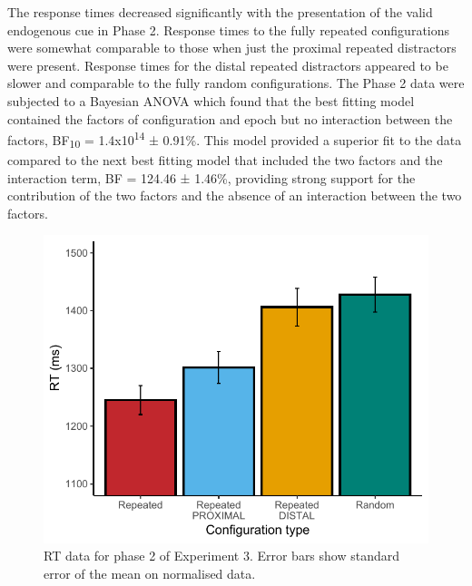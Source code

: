 \documentclass[
  man,floatsintext]{apa7}
\begin{document}
The response times decreased significantly with the presentation of the valid endogenous cue in Phase 2. Response times to the fully repeated configurations were somewhat comparable to those when just the proximal repeated distractors were present. Response times for the distal repeated distractors appeared to be slower and comparable to the fully random configurations. The Phase 2 data were subjected to a Bayesian ANOVA which found that the best fitting model contained the factors of configuration and epoch but no interaction between the factors, BF\textsubscript{10} = 1.4x10\textsuperscript{14} ± 0.91\%. This model provided a superior fit to the data compared to the next best fitting model that included the two factors and the interaction term, BF = 124.46 ± 1.46\%, providing strong support for the contribution of the two factors and the absence of an interaction between the two factors.

\begin{figure}

{\centering \includegraphics{CCC_ms1_files/figure-latex/Exp3-Phase-2-figure-1} 

}

\caption{RT data for phase 2 of Experiment 3. Error bars show standard error of the mean on normalised data.}\label{fig:Exp3-Phase-2-figure}
\end{figure}
\end{document}
